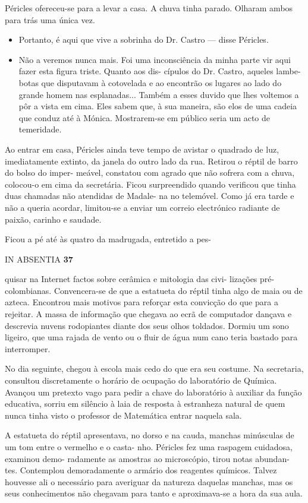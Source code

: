 Péricles ofereceu-se para a levar a casa. A chuva tinha parado. Olharam
ambos para trás uma única vez.

\begin{itemize}
\tightlist
\item
  Portanto, é aqui que vive a sobrinha do Dr. Castro --- disse Péricles.
\item
  Não a veremos nunca mais. Foi uma inconsciência da minha parte vir
  aqui fazer esta figura triste. Quanto aos dis- cípulos do Dr. Castro,
  aqueles lambe-botas que disputavam à cotovelada e ao encontrão os
  lugares ao lado do grande homem nas esplanadas... Também a esses
  duvido que lhes voltemos a pôr a vista em cima. Eles sabem que, à sua
  maneira, são elos de uma cadeia que conduz até à Mónica. Mostrarem-se
  em público seria um acto de temeridade.
\end{itemize}

Ao entrar em casa, Péricles ainda teve tempo de avistar o quadrado de
luz, imediatamente extinto, da janela do outro lado da rua. Retirou o
réptil de barro do bolso do imper- meável, constatou com agrado que não
sofrera com a chuva, colocou-o em cima da secretária. Ficou surpreendido
quando verificou que tinha duas chamadas não atendidas de Madale- na no
telemóvel. Como já era tarde e não a queria acordar, limitou-se a enviar
um correio electrónico radiante de paixão, carinho e saudade.

Ficou a pé até às quatro da madrugada, entretido a pes-

IN ABSENTIA \textbf{37}

quisar na Internet factos sobre cerâmica e mitologia das civi- lizações
pré-colombianas. Convencera-se de que a estatueta do réptil tinha algo
de maia ou de azteca. Encontrou mais motivos para reforçar esta
convicção do que para a rejeitar. A massa de informação que chegava ao
ecrã de computador dançava e descrevia nuvens rodopiantes diante dos
seus olhos toldados. Dormiu um sono ligeiro, que uma rajada de vento ou
o fluir de água num cano teria bastado para interromper.

No dia seguinte, chegou à escola mais cedo do que era seu costume. Na
secretaria, consultou discretamente o horário de ocupação do laboratório
de Química. Avançou um pretexto vago para pedir a chave do laboratório à
auxiliar da função educativa, sorriu em silêncio à laia de resposta à
estranheza natural de quem nunca tinha visto o professor de Matemática
entrar naquela sala.

A estatueta do réptil apresentava, no dorso e na cauda, manchas
minúsculas de um tom entre o vermelho e o casta- nho. Péricles fez uma
raspagem cuidadosa, examinou demo- radamente as amostras ao microscópio,
tirou notas abundan- tes. Contemplou demoradamente o armário dos
reagentes químicos. Talvez houvesse ali o necessário para averiguar da
natureza daquelas manchas, mas os seus conhecimentos não chegavam para
tanto e aproximava-se a hora da sua aula.

